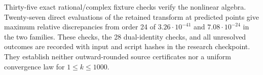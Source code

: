 Thirty-five exact rational/complex fixture checks verify the nonlinear
algebra. Twenty-seven direct evaluations of the retained transform at
predicted points give maximum relative discrepancies from order 24 of
$3.26\cdot10^{-41}$ and $7.08\cdot10^{-24}$ in the two families.
These checks, the 28 dual-identity checks, and all unresolved outcomes
are recorded with input and script hashes in the research checkpoint.
They establish neither outward-rounded source certificates nor a
uniform convergence law for $1\le k\le1000$.
